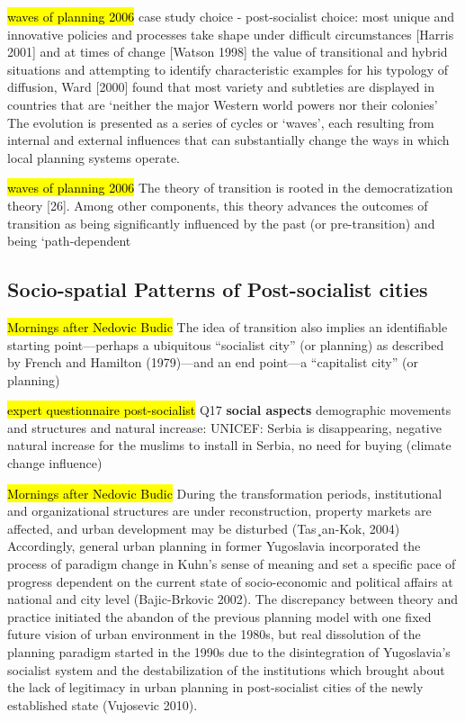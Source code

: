 \documentclass[11pt]{report}
\begin{document}
\hl{waves of planning 2006}
case study choice - post-socialist choice:   most  unique  and  innovative  policies  and  processes  take shape under difficult circumstances [Harris 2001] and at times of change [Watson 1998]
the value of transitional and hybrid situations and attempting to identify characteristic  examples  for  his  typology  of  diffusion,  Ward  [2000]  found  that  most  variety  and subtleties are displayed in countries that are ‘neither the major Western world powers nor their colonies’
The evolution is presented as a series of cycles or ‘waves’, each resulting from internal and external influences that can substantially change the ways in which local planning systems operate.

\hl{waves of planning 2006}
The  theory  of  transition  is  rooted  in  the democratization  theory  [26].  Among  other components,  this  theory  advances  the  outcomes  of  transition  as  being  significantly  influenced by the past (or pre-transition) and being ‘path-dependent

\subsection{Socio-spatial Patterns of Post-socialist cities}

\hl{Mornings after Nedovic Budic}
The idea of transition also implies an identiﬁable starting point—perhaps a ubiquitous “socialist city” (or planning) as described by French and Hamilton (1979)—and an end point—a “capitalist city” (or planning)

\hl{expert questionnaire post-socialist}
Q17
\textbf{social aspects}
demographic movements and structures
and natural increase:
UNICEF: Serbia is disappearing, negative natural increase
for the muslims to install in Serbia, no need for buying (climate change influence)

\hl{Mornings after Nedovic Budic}
During the transformation periods, institutional and organizational structures are under reconstruction, property markets are affected, and urban development may be disturbed (Tas¸an-Kok, 2004)
\\
Accordingly, general urban planning in former Yugoslavia incorporated the process of paradigm change in Kuhn’s sense of meaning and set a specific pace of progress dependent on the current state of socio-economic and political affairs at national and city level (Bajic-Brkovic 2002). The discrepancy between theory and practice initiated the abandon of the previous planning model with one fixed future vision of urban environment in the 1980s, but real dissolution of the planning paradigm started in the 1990s due to the disintegration of Yugoslavia’s socialist system and the destabilization of the institutions which brought about the lack of legitimacy in urban planning in post-socialist cities of the newly established state (Vujosevic 2010).
\end{document}
